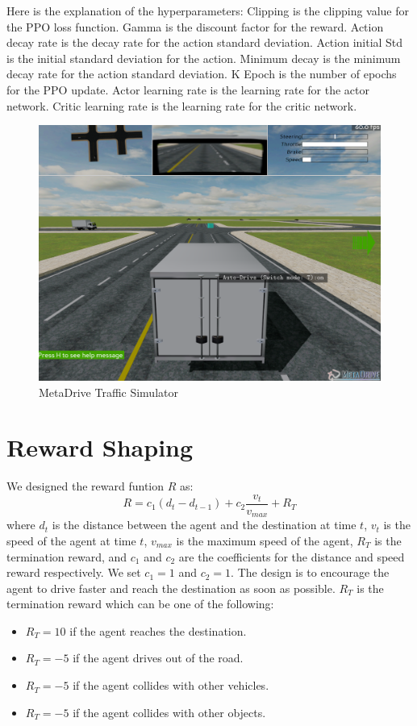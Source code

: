 Here is the explanation of the hyperparameters: Clipping is the clipping value for the PPO loss function.
Gamma is the discount factor for the reward.
Action decay rate is the decay rate for the action standard deviation.
Action initial Std is the initial standard deviation for the action.
Minimum decay is the minimum decay rate for the action standard deviation.
K Epoch is the number of epochs for the PPO update.
Actor learning rate is the learning rate for the actor network.
Critic learning rate is the learning rate for the critic network.

\begin{figure}[htbp]
    \centering
    \includegraphics[width=12cm]{assets/meta}
    \caption{MetaDrive Traffic Simulator}
    \label{fig:metadrive}
\end{figure}



\section{Reward Shaping}\label{sec:reward-shaping}
We designed the reward funtion $R$ as:
\begin{equation}
    R = c_{1}(d_{t} - d_{t-1}) + c_{2}\frac{v_{t}}{v_{max}} + R_{T}
\end{equation}
where $d_{t}$ is the distance between the agent and the destination at time $t$, $v_{t}$ is the speed of the agent at time $t$, $v_{max}$ is the maximum speed of the agent, $R_{T}$ is the termination reward, and $c_{1}$ and $c_{2}$ are the coefficients for the distance and speed reward respectively.
We set $c_{1} = 1$ and $c_{2} = 1$.
The design is to encourage the agent to drive faster and reach the destination as soon as possible.
$R_{T}$ is the termination reward which can be one of the following:
\begin{itemize}
    \item $R_{T} = 10$ if the agent reaches the destination.
    \item $R_{T} = -5$ if the agent drives out of the road.
    \item $R_{T} = -5$ if the agent collides with other vehicles.
    \item $R_{T} = -5$ if the agent collides with other objects.
\end{itemize}

